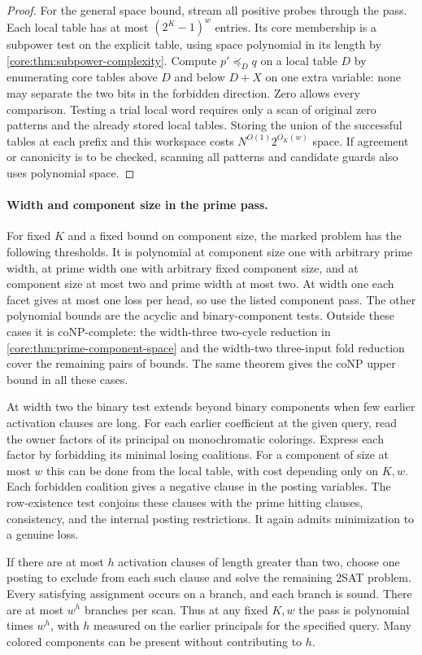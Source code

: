 \begin{proof}
For the general space bound, stream all positive probes through the
pass. Each local table has at most $(2^K-1)^w$ entries. Its core
membership is a subpower test on the explicit table, using space
polynomial in its length by \cref{core:thm:subpower-complexity}.
Compute $p'\preceq_D q$ on a local table $D$ by enumerating core
tables above $D$ and below $D+X$ on one extra variable: none may
separate the two bits in the forbidden direction. Zero allows every
comparison. Testing a trial local word requires only a scan of
original zero patterns and the already stored local tables.
Storing the union of the successful tables at each prefix and this
workspace costs $N^{O(1)}2^{O_K(w)}$ space. If agreement or canonicity
is to be checked, scanning all patterns and candidate guards also
uses polynomial space.
\end{proof}

\paragraph{Width and component size in the prime pass.}
For fixed $K$ and a fixed bound on component size,
the marked problem has the following thresholds.
It is polynomial at component size one with
arbitrary prime width, at prime width one with
arbitrary fixed component size, and at component
size at most two and prime width at most two.
At width one each facet gives at most one loss
per head, so use the listed component pass.
The other polynomial bounds are the acyclic and
binary-component tests. Outside these cases it is
coNP-complete: the width-three two-cycle reduction
in \cref{core:thm:prime-component-space} and the
width-two three-input fold reduction cover the
remaining pairs of bounds. The same theorem gives
the coNP upper bound in all these cases.

At width two the binary test extends beyond binary
components when few earlier activation clauses are
long. For each earlier coefficient at the given
query, read the owner factors of its principal on
monochromatic colorings. Express each factor by
forbidding its minimal losing coalitions. For a
component of size at most $w$ this can be done
from the local table, with cost depending only
on $K,w$. Each forbidden coalition gives a
negative clause in the posting variables. The
row-existence test conjoins these clauses with
the prime hitting clauses, consistency, and the
internal posting restrictions. It again admits
minimization to a genuine loss.

If there are at most $h$ activation clauses of
length greater than two, choose one posting to
exclude from each such clause and solve the
remaining 2SAT problem. Every satisfying assignment
occurs on a branch, and each branch is sound.
There are at most $w^h$ branches per scan.
Thus at any fixed $K,w$ the pass is polynomial
times $w^h$, with $h$ measured on the earlier
principals for the specified query. Many colored
components can be present without contributing
to $h$.

